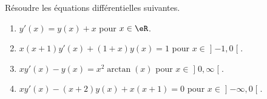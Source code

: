 
\begin{exercice}\label{exoTD6-0002}

	Résoudre les équations différentielles suivantes.
	\begin{enumerate}
		\item
			$y'(x)=y(x)+x$ pour $x\in\eR$.
		\item
			$x(x+1)y'(x)+(1+x)y(x)=1$ pour $x\in\mathopen] -1 , 0 \mathclose[$.
		\item
			$xy'(x)-y(x)=x^2\arctan(x)$ pour $x\in\mathopen] 0 , \infty \mathclose[$.
		\item
			$xy'(x)-(x+2)y(x)+x(x+1)=0$ pour $x\in\mathopen] -\infty , 0 \mathclose[$.
	\end{enumerate}

\end{exercice}
